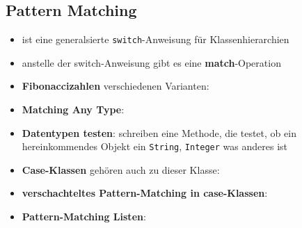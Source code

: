 \subsection{Pattern Matching}
\begin{itemize}
  \item ist eine generalsierte \texttt{switch}-Anweisung für Klassenhierarchien
  \item anstelle der switch-Anweisung gibt es eine \textbf{match}-Operation
  
  
  
  \item \textbf{Fibonaccizahlen} verschiedenen Varianten:
  
  
  
  \item \textbf{Matching Any Type}:
  
  
  
  \item \textbf{Datentypen testen}: schreiben eine Methode, die testet,
  ob ein hereinkommendes Objekt ein \texttt{String}, \texttt{Integer} \oder 
  was anderes ist
  
  
  
  \item \textbf{Case-Klassen} gehören auch zu dieser Klasse:
  
  
  
  \item \textbf{verschachteltes Pattern-Matching in case-Klassen}:
  
  

  \item \textbf{Pattern-Matching Listen}:
  
  
  
\end{itemize}


